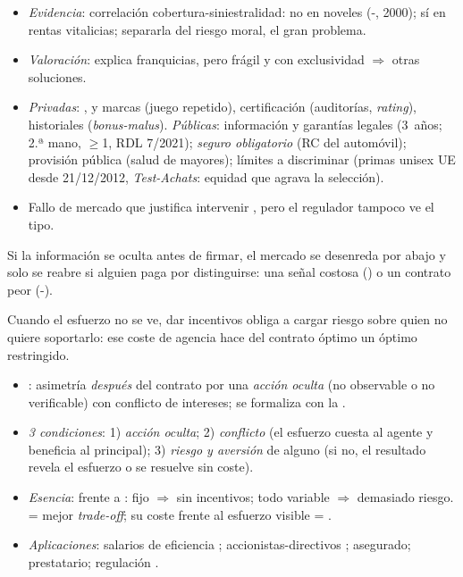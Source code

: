 \documentclass{article}
\begin{document}
\begin{columnas}
\begin{itemize}
\item \emph{Evidencia}: correlación cobertura-siniestralidad: no en noveles (-, 2000); sí en rentas vitalicias; separarla del riesgo moral, el gran problema.
\item \emph{Valoración}: explica franquicias, pero frágil y con exclusividad $\Rightarrow$ otras soluciones.
\end{itemize}
\begin{itemize}
\item \emph{Privadas}: ,  y marcas (juego repetido), certificación (auditorías, \emph{rating}), historiales (\emph{bonus-malus}). \emph{Públicas}: información y garantías legales (3~años; 2.ª mano, $\geq$1, RDL 7/2021); \emph{seguro obligatorio} (RC del automóvil); provisión pública (salud de mayores); límites a discriminar (primas unisex UE desde 21/12/2012, \emph{Test-Achats}: equidad que agrava la selección).
\item Fallo de mercado que justifica intervenir , pero el regulador tampoco ve el tipo.
\end{itemize}
\begin{ideaclave}
Si la información se oculta antes de firmar, el mercado se desenreda por abajo y solo se reabre si alguien paga por distinguirse: una señal costosa () o un contrato peor (-).
\end{ideaclave}

\begin{ideaclave}
Cuando el esfuerzo no se ve, dar incentivos obliga a cargar riesgo sobre quien no quiere soportarlo: ese coste de agencia hace del contrato óptimo un óptimo restringido.
\end{ideaclave}

\begin{itemize}
\item {}: asimetría \emph{después} del contrato por una \emph{acción oculta} (no observable o no verificable) con conflicto de intereses; se formaliza con la .
\item \emph{3 condiciones}: 1) \emph{acción oculta}; 2) \emph{conflicto} (el esfuerzo cuesta al agente y beneficia al principal); 3) \emph{riesgo y aversión} de alguno (si no, el resultado revela el esfuerzo o se resuelve sin coste).
\item \emph{Esencia}:  frente a : fijo $\Rightarrow$ sin incentivos; todo variable $\Rightarrow$ demasiado riesgo.  = mejor \emph{trade-off}; su coste frente al esfuerzo visible = .
\item \emph{Aplicaciones}: salarios de eficiencia ; accionistas-directivos ; asegurado; prestatario; regulación .
\end{itemize}


\end{columnas}
\end{document}

